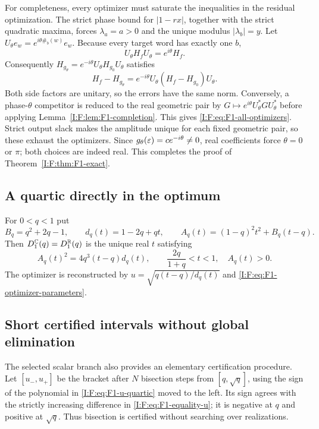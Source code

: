 For completeness, every optimizer must saturate the inequalities in the
residual optimization. The strict phase bound for $|1-rx|$, together with
the strict quadratic maxima, forces $\lambda_a=a>0$ and the unique
modulus $|\lambda_b|=y$. Let
$U_\theta e_w=e^{i\theta\#_b(w)}e_w$. Because every target word has
exactly one $b$,
\[
 U_\theta H_fU_\theta=e^{i\theta}H_f.
\]
Consequently
$H_{g_\theta}=e^{-i\theta}U_\theta H_{g_0}U_\theta$ satisfies
\[
 H_f-H_{g_\theta}
 =e^{-i\theta}U_\theta(H_f-H_{g_0})U_\theta.
\]
Both side factors are unitary, so the errors have the same norm.
Conversely, a phase-$\theta$ competitor is reduced to the real geometric
pair by $G\mapsto e^{i\theta}U_\theta^*GU_\theta^*$ before applying
Lemma~\ref{I:F:lem:F1-completion}. This gives
\eqref{I:F:eq:F1-all-optimizers}. Strict output slack makes
the amplitude unique for each fixed geometric pair, so these exhaust the
optimizers. Since $g_\theta(\varepsilon)=ce^{-i\theta}\ne0$, real
coefficients force $\theta=0$ or $\pi$; both choices are indeed real.
This completes the proof of Theorem~\ref{I:F:thm:F1-exact}.

\subsection{A quartic directly in the optimum}

\begin{theorem}
\label{I:F:thm:F1-t-quartic}
For $0<q<1$ put
\[
 B_q=q^2+2q-1,\qquad d_q(t)=1-2q+qt,\qquad
 A_q(t)=(1-q)^2t^2+B_q(t-q).
\]
Then $D_1^{\mathbb C}(q)=D_1^{\mathbb R}(q)$ is the unique real $t$ satisfying
\begin{equation}
 \boxed{\displaystyle A_q(t)^2=4q^3(t-q)d_q(t),\qquad
 \frac{2q}{1+q}<t<1,\quad A_q(t)>0.}
 \label{I:F:eq:F1-direct-quartic}
\end{equation}
The optimizer is reconstructed by
$u=\sqrt{q(t-q)/d_q(t)}$ and
\eqref{I:F:eq:F1-optimizer-parameters}.
\end{theorem}



\subsection{Short certified intervals without global elimination}

The selected scalar branch also provides an elementary certification
procedure. Let $[u_-,u_+]$ be the bracket after $N$ bisection steps from
$[q,\sqrt q]$, using the sign of the polynomial in
\eqref{I:F:eq:F1-u-quartic} moved to the left. Its sign agrees with the
strictly increasing difference in \eqref{I:F:eq:F1-equality-u}; it is
negative at $q$ and positive at $\sqrt q$. Thus bisection is certified
without searching over realizations.


